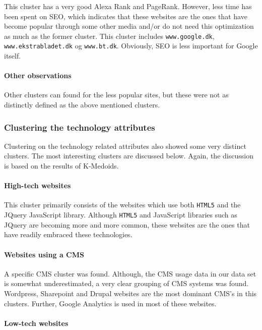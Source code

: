 This cluster has a very good Alexa Rank and PageRank. However, less time has been spent on SEO, which indicates that these websites are the ones that have become popular through some other media and/or do not need this optimization as much as the former cluster. This cluster includes \verb|www.google.dk|, \verb|www.ekstrabladet.dk| og \verb|www.bt.dk|. Obviously, SEO is less important for Google itself.

\paragraph{Other observations} Other clusters can found for the less popular sites, but these were not as distinctly defined as the above mentioned clusters.

\subsubsection{Clustering the technology attributes}

Clustering on the technology related attributes also showed some very distinct clusters. The most interesting clusters are discussed below. Again, the discussion is based on the results of K-Medoids.

\paragraph{High-tech websites}

This cluster primarily consists of the websites which use both \texttt{HTML5} and the JQuery JavaScript library. Although \texttt{HTML5} and JavaScript libraries such as JQuery are becoming more and more common, these websites are the ones that have readily embraced these technologies.

\paragraph{Websites using a CMS}

A specific CMS cluster was found. Although, the CMS usage data in our data set is somewhat underestimated, a very clear grouping of CMS systems was found. Wordpress, Sharepoint and Drupal websites are the most dominant CMS's in this clusters. Further, Google Analytics is used in most of these websites.

\paragraph{Low-tech websites}

